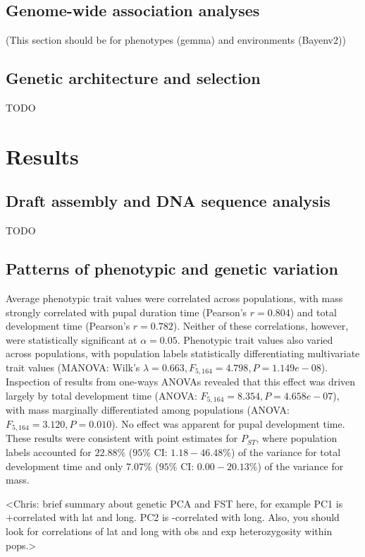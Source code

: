 \documentclass[smallextended]{svjour3}
\begin{document}
\subsection*{Genome-wide association analyses}
(This section should be for phenotypes (gemma) and environments (Bayenv2))

\subsection*{Genetic architecture and selection}
TODO

\section*{Results}

\subsection*{Draft assembly and DNA sequence analysis}
TODO

\subsection*{Patterns of phenotypic and genetic variation}
Average phenotypic trait values were correlated across populations, with mass 
strongly correlated with pupal duration time (Pearson's $r = 0.804$) and 
total development time (Pearson's $r = 0.782$).  Neither of these correlations, however, 
were statistically significant at $\alpha = 0.05$. Phenotypic trait values also varied across populations, with
population labels statistically differentiating multivariate trait
values (MANOVA: Wilk's $\lambda = 0.663, F_{5,164} = 4.798,P = 1.149e-08$).
Inspection of results from one-ways ANOVAs revealed that this effect
was driven largely by total development time (ANOVA: $F_{5,164} = 8.354,P = 4.658e-07$), 
with mass marginally differentiated among populations (ANOVA: $F_{5,164} = 3.120,P = 0.010$). 
No effect was apparent for pupal development time. These results were consistent
with point estimates for $P_{ST}$, where population labels accounted
for $22.88\%$ ($95\%$ CI: $1.18 - 46.48\%$) of the variance for total development
time and only $7.07\%$ ($95\%$ CI: $0.00 - 20.13\%$) of the variance for mass.

<Chris: brief summary about genetic PCA and FST here, for example PC1 is +correlated
with lat and long. PC2 is -correlated with long. Also, you should look for correlations
of lat and long with obs and exp heterozygosity within pops.>
\end{document}
